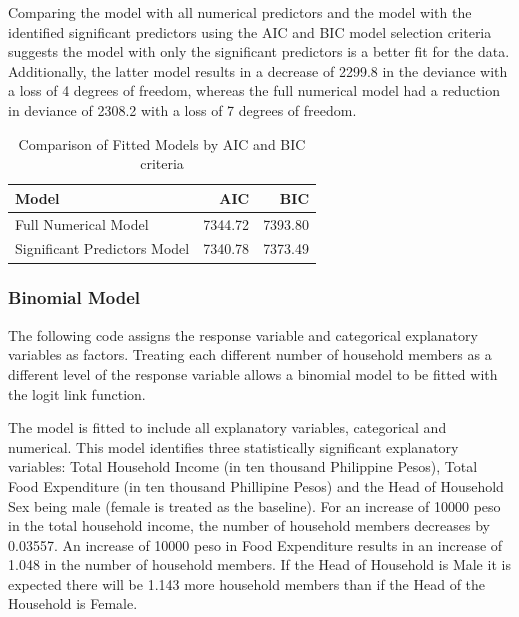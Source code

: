 \documentclass[
]{article}
\begin{document}
Comparing the model with all numerical predictors and the model with the
identified significant predictors using the AIC and BIC model selection
criteria suggests the model with only the significant predictors is a
better fit for the data. Additionally, the latter model results in a
decrease of 2299.8 in the deviance with a loss of 4 degrees of freedom,
whereas the full numerical model had a reduction in deviance of 2308.2
with a loss of 7 degrees of freedom.

\begin{table}[H]

\caption{\label{tab:model comparison}Comparison of Fitted Models by AIC and BIC criteria }
\centering
\begin{tabular}[t]{lrr}
\toprule
Model & AIC & BIC\\
\midrule
Full Numerical Model & 7344.72 & 7393.80\\
Significant Predictors Model & 7340.78 & 7373.49\\
\bottomrule
\end{tabular}
\end{table}

\hypertarget{binomial-model}{%
\subsubsection{Binomial Model}\label{binomial-model}}

The following code assigns the response variable and categorical
explanatory variables as factors. Treating each different number of
household members as a different level of the response variable allows a
binomial model to be fitted with the logit link function.

The model is fitted to include all explanatory variables, categorical
and numerical. This model identifies three statistically significant
explanatory variables: Total Household Income (in ten thousand
Philippine Pesos), Total Food Expenditure (in ten thousand Phillipine
Pesos) and the Head of Household Sex being male (female is treated as
the baseline). For an increase of 10000 peso in the total household
income, the number of household members decreases by 0.03557. An
increase of 10000 peso in Food Expenditure results in an increase of
1.048 in the number of household members. If the Head of Household is
Male it is expected there will be 1.143 more household members than if
the Head of the Household is Female.
\end{document}
